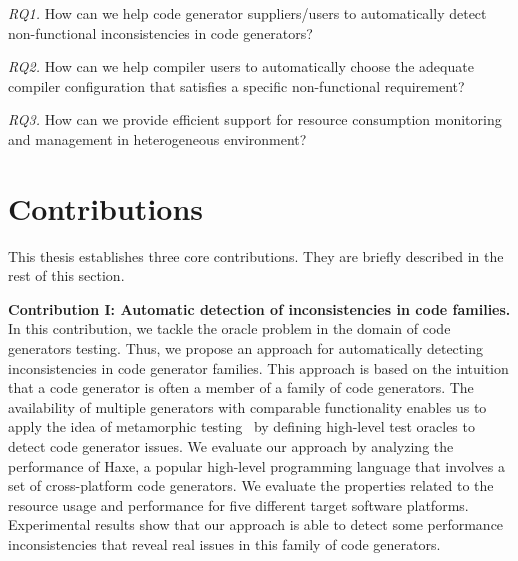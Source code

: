 \textit{RQ1.} How can we help code generator suppliers/users to automatically detect non-functional inconsistencies in code generators?

\textit{RQ2.} How can we help compiler users to automatically choose the adequate compiler configuration that satisfies a specific non-functional requirement?

\textit{RQ3.} How can we provide efficient support for resource consumption monitoring and management in heterogeneous environment?


\section{Contributions}
This thesis establishes three core contributions. They are briefly described in the rest of this section.

\textbf{Contribution I: Automatic detection of inconsistencies in code  families.}
In this contribution, we tackle the oracle problem in the domain of code generators testing. Thus, we propose an approach for automatically detecting inconsistencies in code generator families.
This approach is based on the intuition that a code generator is often a member of a family of code generators. The availability of multiple generators with comparable functionality enables us to apply the idea of metamorphic testing~\cite{zhou2004metamorphic} by defining high-level test oracles to detect code generator issues.
We evaluate our approach by analyzing the performance of Haxe, a popular high-level programming language that involves a set of cross-platform code generators. We evaluate the properties related to the resource usage and performance for five different target software platforms. Experimental results show that our approach is able to detect some performance inconsistencies that reveal real issues in this family of code generators.

